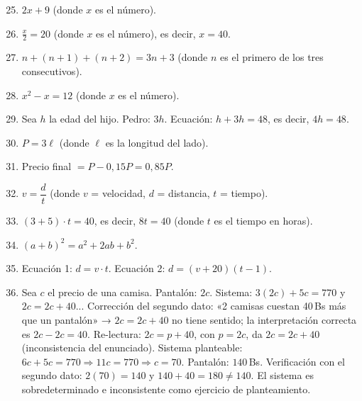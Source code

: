 \documentclass[12pt, a4paper]{article}
\begin{document}
\begin{enumerate}[leftmargin=*, label=\textbf{\arabic*.}]
  \setcounter{enumi}{24}
  \item $2x + 9$ (donde $x$ es el número).

  \item $\frac{x}{2} = 20$ (donde $x$ es el número), es decir, $x = 40$.

  \item $n + (n + 1) + (n + 2) = 3n + 3$ (donde $n$ es el primero de los tres consecutivos).

  \item $x^2 - x = 12$ (donde $x$ es el número).

  \item Sea $h$ la edad del hijo. Pedro: $3h$. Ecuación: $h + 3h = 48$, es decir, $4h = 48$.

  \item $P = 3\ell$ (donde $\ell$ es la longitud del lado).

  \item Precio final $= P - 0{,}15P = 0{,}85P$.

  \item $v = \dfrac{d}{t}$ (donde $v$ = velocidad, $d$ = distancia, $t$ = tiempo).

  \item $(3 + 5) \cdot t = 40$, es decir, $8t = 40$ (donde $t$ es el tiempo en horas).

  \item $(a + b)^2 = a^2 + 2ab + b^2$.

  \item Ecuación 1: $d = v \cdot t$. Ecuación 2: $d = (v + 20)(t - 1)$.

  \item Sea $c$ el precio de una camisa. Pantalón: $2c$. Sistema: $3(2c) + 5c = 770$ y $2c = 2c + 40$... Corrección del segundo dato: «2 camisas cuestan 40\,Bs más que un pantalón» → $2c = 2c + 40$ no tiene sentido; la interpretación correcta es $2c - 2c = 40$. Re-lectura: $2c = p + 40$, con $p = 2c$, da $2c = 2c + 40$ (inconsistencia del enunciado). Sistema planteable: $6c + 5c = 770 \Rightarrow 11c = 770 \Rightarrow c = 70$. Pantalón: $140$\,Bs. Verificación con el segundo dato: $2(70) = 140$ y $140 + 40 = 180 \neq 140$. El sistema es sobredeterminado e inconsistente como ejercicio de planteamiento.
\end{enumerate}
\end{document}
